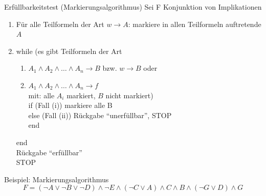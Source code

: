\begin{frame}{Erfüllbarkeitstest (Markierungsalgorithmus)}
	Sei F Konjunktion von Implikationen
	\begin{enumerate}
		\item Für alle Teilformeln der Art $w \rightarrow A$: markiere in allen Teilformeln auftretende $A$
		\item while (es gibt Teilformeln der Art
		\begin{enumerate}
			\item[(i)] $A_1 \land A_2 \land \ldots \land A_n \rightarrow B$ bzw. $w \rightarrow B$ oder
			\item[(ii)] $A_1 \land A_2 \land \ldots \land A_n \rightarrow f$\\
			mit: alle $A_i$ markiert, $B$ nicht markiert)\\
			if (Fall (i)) markiere alle B\\
			else (Fall (ii)) Rückgabe "`unerfüllbar"', STOP\\
			end
		\end{enumerate}
		end\\
		Rückgabe "`erfüllbar"'\\
		STOP
	\end{enumerate}
\end{frame}

\begin{frame}{Beispiel: Markierungsalgorithmus}
	$$F=(\neg A \lor \neg B \lor \neg D) \land \neg E \land (\neg C \lor A) \land C \land B \land (\neg G \lor D) \land G$$
\end{frame}

